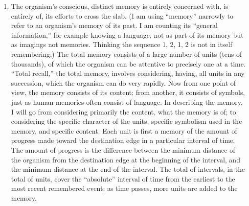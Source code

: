 \begin{enumerate}[wide, nosep, itemsep=0.5em]
\item The organism's conscious, distinct memory is entirely concerned 
with, is entirely of, its efforts to cross the slab. (I am using \enquote{memory} 
narrowly to refer to an organism's memory of its past. I am counting its 
\enquote{general information,} for example knowing a language, not as part of its 
memory but as imagings not memories. Thinking the sequence 1, 2, 1, 2 is 
not in itself remembering.) The total memory consists of a large number of 
units (tens of thousands), of which the organism can be attentive to precisely 
one at a time. \enquote{Total recall,} the total memory, involves considering, having, 
all units in any succession, which the organism can do very rapidly. Now 
from one point of view, the memory consists of its content; from another, it 
consists of symbols, just as human memories often consist of language. In 
describing the memory, I will go from considering primarily the content, 
what the memory is of; to considering the specific character of the units, 
specific symbolism used in the memory, and specific content. Each unit is 
first a memory of the amount of progress made toward the destination edge 
in a particular interval of time. The amount of progress is the difference 
between the minimum distance of the organism from the destination edge at 
the beginning of the interval, and the minimum distance at the end of the 
interval. The total of intervals, in the total of units, cover the \enquote{absolute} 
interval of time from the earliest to the most recent remembered event; as 
time passes, more units are added to the memory. 


\end{enumerate}
